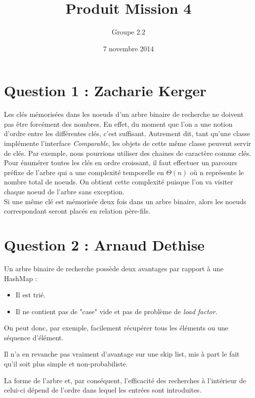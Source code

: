 \documentclass[10pt,a4paper]{article}
\date{7 novembre 2014}
\author{Groupe 2.2}
\title{Produit Mission 4}
\begin{document}
\maketitle

\section*{Question 1 : Zacharie Kerger}

Les clés mémorisées dans les noeuds d'un arbre binaire de recherche ne doivent pas être forcément des nombres. En effet, du moment que l'on a une notion d'ordre entre les différentes clés, c'est suffisant.  Autrement dit, tant qu'une classe implémente l'interface \emph{Comparable}, les objets de cette même classe peuvent servir de clés. Par exemple, nous pourrions utiliser des chaines de caractère comme clés.\\
\newline
Pour énumérer toutes les clés en ordre croissant, il faut effectuer un parcours préfixe de l'arbre qui a une complexité temporelle en $\Theta(n)$ où n représente le nombre total de noeuds. On obtient cette complexité puisque l'on va visiter chaque noeud de l'arbre sans exception.\\
\newline
Si une même clé est mémorisée deux fois dans un arbre binaire, alors les noeuds correspondant seront placés en relation père-fils.

\section*{Question 2 : Arnaud Dethise}

	Un arbre binaire de recherche possède deux avantages par rapport à une HashMap :
	\begin{itemize}
		\item Il est trié.
		\item Il ne contient pas de "case" vide et pas de problème de \textit{load factor}.
	\end{itemize}
	On peut donc, par exemple, facilement récupérer tous les éléments ou une séquence d'élément.
	
	Il n'a en revanche pas vraiment d'avantage sur une skip list, mis à part le fait qu'il soit plus simple et non-probabiliste.
	
	\vspace{0.5cm}
	La forme de l'arbre et, par conséquent, l'efficacité des recherches à l'intérieur de celui-ci dépend de l'ordre dans lequel les entrées sont introduites.
	
\end{document}
